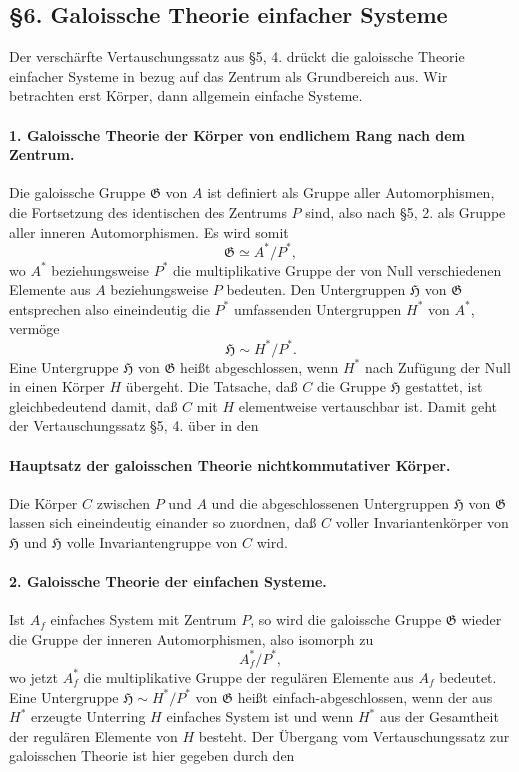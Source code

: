 \documentclass[11pt]{article}
\providecommand{\Gcal}{\mathfrak G}
\begin{document}
\subsection*{§6. Galoissche Theorie einfacher Systeme}

Der verschärfte Vertauschungssatz aus §5, 4. drückt die galoissche Theorie einfacher Systeme in bezug auf das Zentrum als Grundbereich aus. Wir betrachten erst Körper, dann allgemein einfache Systeme.

\paragraph{1. Galoissche Theorie der Körper von endlichem Rang nach dem Zentrum.}
Die galoissche Gruppe \(\Gcal\) von \(A\) ist definiert als Gruppe aller Automorphismen, die Fortsetzung des identischen des Zentrums \(P\) sind, also nach §5, 2. als Gruppe aller inneren Automorphismen. Es wird somit
\[
        \Gcal \simeq A^*/P^*,
\]
wo \(A^*\) beziehungsweise \(P^*\) die multiplikative Gruppe der von Null verschiedenen Elemente aus \(A\) beziehungsweise \(P\) bedeuten. Den Untergruppen \(\mathfrak H\) von \(\Gcal\) entsprechen also eineindeutig die \(P^*\) umfassenden Untergruppen \(H^*\) von \(A^*\), vermöge
\[
        \mathfrak H \sim H^*/P^* .
\]
Eine Untergruppe \(\mathfrak H\) von \(\Gcal\) heißt abgeschlossen, wenn \(H^*\) nach Zufügung der Null in einen Körper \(H\) übergeht. Die Tatsache, daß \(C\) die Gruppe \(\mathfrak H\) gestattet, ist gleichbedeutend damit, daß \(C\) mit \(H\) elementweise vertauschbar ist. Damit geht der Vertauschungssatz §5, 4. über in den

\paragraph{Hauptsatz der galoisschen Theorie nichtkommutativer Körper.}
Die Körper \(C\) zwischen \(P\) und \(A\) und die abgeschlossenen Untergruppen \(\mathfrak H\) von \(\Gcal\) lassen sich eineindeutig einander so zuordnen, daß \(C\) voller Invariantenkörper von \(\mathfrak H\) und \(\mathfrak H\) volle Invariantengruppe von \(C\) wird.

\paragraph{2. Galoissche Theorie der einfachen Systeme.}
Ist \(A_f\) einfaches System mit Zentrum \(P\), so wird die galoissche Gruppe \(\Gcal\) wieder die Gruppe der inneren Automorphismen, also isomorph zu
\[
        A_f^*/P^*,
\]
wo jetzt \(A_f^*\) die multiplikative Gruppe der regulären Elemente aus \(A_f\) bedeutet. Eine Untergruppe \(\mathfrak H\sim H^*/P^*\) von \(\Gcal\) heißt einfach-abgeschlossen, wenn der aus \(H^*\) erzeugte Unterring \(H\) einfaches System ist und wenn \(H^*\) aus der Gesamtheit der regulären Elemente von \(H\) besteht. Der Übergang vom Vertauschungssatz zur galoisschen Theorie ist hier gegeben durch den
\end{document}
